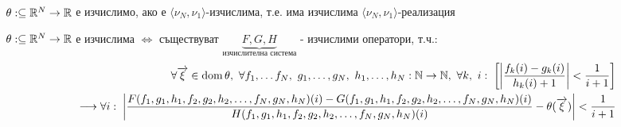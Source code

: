 \begin{definition}
    $\theta: \subseteq {\mathbb{R}}^N \to {\mathbb{R}}$ е изчислимо, ако е $\langle \nu_N, \nu_1 \rangle$-изчислима, т.е. има изчислима $\langle \nu_N, \nu_1 \rangle$-реализация
\end{definition}
\begin{proposition}
    $\theta: \subseteq {\mathbb{R}}^N \to {\mathbb{R}}$ е изчислима $\iff$ съществуват $\underbrace{F, G, H}_{\text{изчислителна система}}$ - изчислими оператори, т.ч.:
    \begin{equation}
        \begin{split}
            \forall \overrightarrow\xi \in \dom\theta,\ \forall f_1, \dots f_N,\ g_1, \dots, g_N,\ h_1, \dots, h_N: \N \to \N,\ \forall k,\ i:\; \left[\left| \frac{f_k(i) - g_k(i)}{h_k(i) + 1}\right| < \frac{1}{i+1} \right]\\
            \longrightarrow \forall i:\; \left| \frac{F(f_1, g_1, h_1, f_2, g_2, h_2, \dots, f_N, g_N, h_N)(i) - G(f_1, g_1, h_1, f_2, g_2, h_2, \dots, f_N, g_N, h_N)(i)}{H(f_1, g_1, h_1, f_2, g_2, h_2, \dots, f_N, g_N, h_N)(i)} - \theta(\overrightarrow\xi)\right| < \frac{1}{i+1}
        \end{split}
    \end{equation}
\end{proposition}
